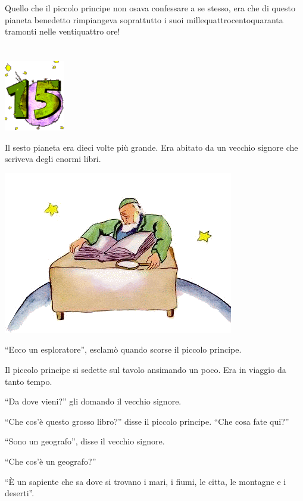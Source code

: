 \documentclass[11pt]{scrbook}
\begin{document}
Quello che il piccolo principe non osava confessare a se stesso, era che
di questo pianeta benedetto rimpiangeva soprattutto i suoi
millequattrocentoquaranta tramonti nelle ventiquattro ore!

\chapter{}
\begin{center}
\includegraphics{img/chapter15}
\end{center}

Il sesto pianeta era dieci volte più grande. Era abitato da un vecchio
signore che scriveva degli enormi libri.

\begin{center}
\includegraphics{img/15a}
\end{center}

``Ecco un esploratore'', esclamò quando scorse il piccolo principe.

Il piccolo principe si sedette sul tavolo ansimando un poco. Era in
viaggio da tanto tempo.

``Da dove vieni?'' gli domando il vecchio signore.

``Che cos'è questo grosso libro?'' disse il piccolo principe. ``Che cosa
fate qui?''

``Sono un geografo'', disse il vecchio signore.

``Che cos'è un geografo?''

``È un sapiente che sa dove si trovano i mari, i fiumi, le citta, le
montagne e i deserti''.
\end{document}

